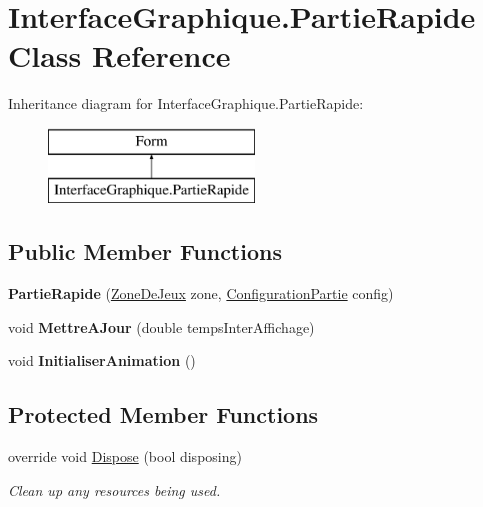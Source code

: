 \hypertarget{class_interface_graphique_1_1_partie_rapide}{\section{Interface\-Graphique.\-Partie\-Rapide Class Reference}
\label{class_interface_graphique_1_1_partie_rapide}
}
Inheritance diagram for Interface\-Graphique.\-Partie\-Rapide\-:\begin{figure}[H]
\begin{center}
\leavevmode
\includegraphics[height=2.000000cm]{class_interface_graphique_1_1_partie_rapide}
\end{center}
\end{figure}
\subsection*{Public Member Functions}
\begin{DoxyCompactItemize}
\item 
\hypertarget{class_interface_graphique_1_1_partie_rapide_ad3daf9eb8862499ed54ebe2e5cb14b2a}{{\bfseries Partie\-Rapide} (\hyperlink{class_interface_graphique_1_1_zone_de_jeux}{Zone\-De\-Jeux} zone, \hyperlink{class_interface_graphique_1_1_configuration_partie}{Configuration\-Partie} config)}\label{class_interface_graphique_1_1_partie_rapide_ad3daf9eb8862499ed54ebe2e5cb14b2a}

\item 
\hypertarget{class_interface_graphique_1_1_partie_rapide_a91f0bc169fe8a836dd75d2447b4db424}{void {\bfseries Mettre\-A\-Jour} (double temps\-Inter\-Affichage)}\label{class_interface_graphique_1_1_partie_rapide_a91f0bc169fe8a836dd75d2447b4db424}

\item 
\hypertarget{class_interface_graphique_1_1_partie_rapide_af5ff96f0fca70376fe5e1a69565eb592}{void {\bfseries Initialiser\-Animation} ()}\label{class_interface_graphique_1_1_partie_rapide_af5ff96f0fca70376fe5e1a69565eb592}

\end{DoxyCompactItemize}
\subsection*{Protected Member Functions}
\begin{DoxyCompactItemize}
\item 
override void \hyperlink{class_interface_graphique_1_1_partie_rapide_a248957e40a9fe9d9ca2e3c90e117b192}{Dispose} (bool disposing)
\begin{DoxyCompactList}\small\item\em Clean up any resources being used. \end{DoxyCompactList}\end{DoxyCompactItemize}


